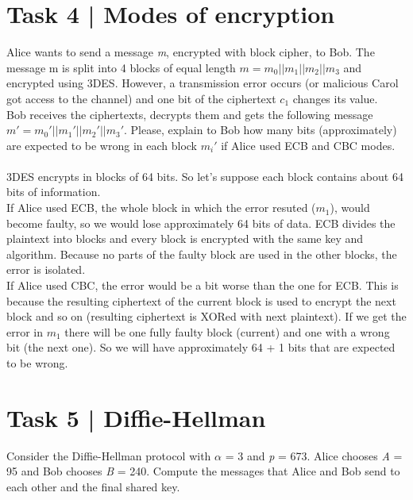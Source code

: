 \documentclass{article}
\begin{document}
\section*{Task 4 | Modes of encryption}
Alice wants to send a message \textit{m}, encrypted with block cipher, to Bob. The message m
is split into 4 blocks of equal length $m = m_0||m_1||m_2||m_3$ and encrypted using 3DES.
However, a transmission error occurs (or malicious Carol got access to the channel) and
one bit of the ciphertext $c_1$ changes its value. \\
Bob receives the ciphertexts, decrypts them and gets the following message 
$m' = m_0'||m_1'||m_2'||m_3'$. 
Please, explain to Bob how many bits (approximately) are expected to
be wrong in each block $m_i'$ if Alice used ECB and CBC modes. \\\\
3DES encrypts in blocks of 64 bits. So let's suppose each block contains about 64 bits of information. \\
If Alice used ECB, the whole block in which the error resuted ($m_1$), would
become faulty, so we would lose approximately 64 bits of data. ECB divides the plaintext
into blocks and every block is encrypted with the same key and algorithm. Because no parts
of the faulty block are used in the other blocks, the error is isolated. \\
If Alice used CBC, the error would be a bit worse than the one for ECB. This is because the
resulting ciphertext of the current block is used to encrypt the next block and so on 
(resulting ciphertext is XORed with next plaintext). If we get the error in $m_1$ there 
will be one fully faulty block (current) and one with a wrong bit (the next one).
So we will have approximately 64 + 1 bits that are expected to be wrong.


\section*{Task 5 | Diffie-Hellman}
Consider the Diffie-Hellman protocol with $\alpha$ = 3 and \textit{p} = 673. Alice chooses
\textit{A} = 95 and Bob chooses \textit{B} = 240. Compute the messages that Alice and Bob
send to each other and the final shared key.
\end{document}
